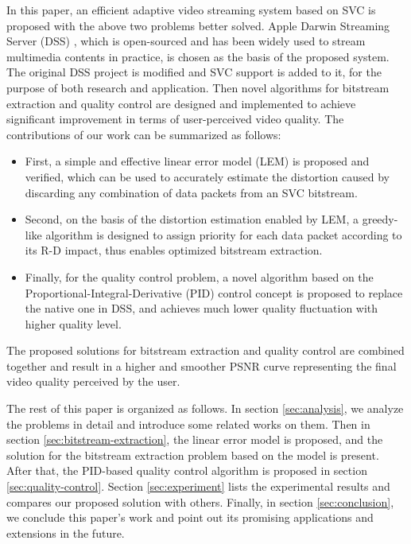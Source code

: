 \documentclass[journal]{IEEEtran}
\begin{document}
In this paper, an efficient adaptive video streaming system based on SVC is proposed with the above two problems better solved. Apple Darwin Streaming Server (DSS) \cite{DSS}, which is open-sourced and has been widely used to stream multimedia contents in practice, is chosen as the basis of the proposed system. The original DSS project is modified and SVC support is added to it, for the purpose of both research and application. Then novel algorithms for bitstream extraction and quality control are designed and implemented to achieve significant improvement in terms of user-perceived video quality. The contributions of our work can be summarized as follows:
\begin{itemize}
\item First, a simple and effective linear error model (LEM) is proposed and verified, which can be used to accurately estimate the distortion caused by discarding any combination of data packets from an SVC bitstream.
\item Second, on the basis of the distortion estimation enabled by LEM, a greedy-like algorithm is designed to assign priority for each data packet according to its R-D impact, thus enables optimized bitstream extraction.
\item Finally, for the quality control problem, a novel algorithm based on the Proportional-Integral-Derivative (PID) control concept is proposed to replace the native one in DSS, and achieves much lower quality fluctuation with higher quality level.
\end{itemize}

The proposed solutions for bitstream extraction and quality control are combined together and result in a higher and smoother PSNR curve representing the final video quality perceived by the user.

The rest of this paper is organized as follows. In section \ref{sec:analysis}, we analyze the problems in detail and introduce some related works on them. Then in section \ref{sec:bitstream-extraction}, the linear error model is proposed, and the solution for the bitstream extraction problem based on the model is present. After that, the PID-based quality control algorithm is proposed in section \ref{sec:quality-control}. Section \ref{sec:experiment} lists the experimental results and compares our proposed solution with others. Finally, in section \ref{sec:conclusion}, we conclude this paper's work and point out its promising applications and extensions in the future.


\end{document}
